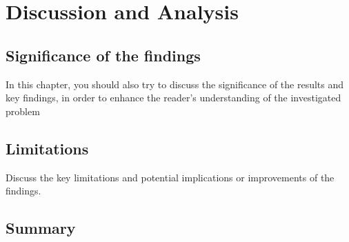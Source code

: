 \chapter{Discussion and Analysis}
\label{ch:discuss}

\section{Significance of the findings}
In this chapter, you should also try to discuss the significance of the results and key findings, in order to enhance the reader's understanding of the investigated problem

\section{Limitations}
Discuss the key limitations and potential implications or improvements of the findings.

\section{Summary}

